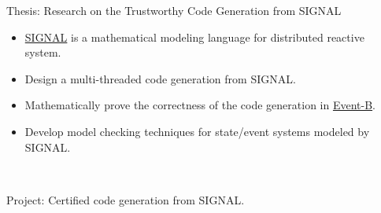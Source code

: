 \documentclass[a4paper,10pt]{memoir} %
\begin{document}




Thesis: Research on the Trustworthy Code Generation from SIGNAL

\begin{itemize}
	\item \href{http://polychrony.inria.fr/}{SIGNAL} is a mathematical modeling language for distributed reactive system.
	\item Design a multi-threaded code generation from SIGNAL.
	\item Mathematically prove  the correctness of the code generation in \href{http://www.event-b.org/}{Event-B}.
	\item Develop model checking techniques for state/event systems modeled by SIGNAL.
\end{itemize}
~\\

Project: Certified code generation from SIGNAL.
~\\




\Sep %



\end{document}
